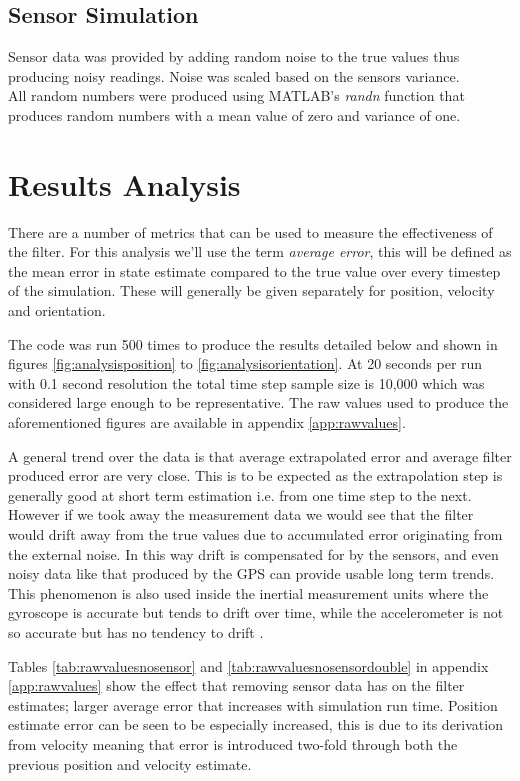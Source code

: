 \subsection{Sensor Simulation}
Sensor data was provided by adding random noise to the true values thus producing noisy readings. Noise was scaled based on the sensors variance.\\

\smallskip
\noindent All random numbers were produced using MATLAB's \textit{randn} function that produces random numbers with a mean value of zero and variance of one.


\section{Results Analysis}
There are a number of metrics that can be used to measure the effectiveness of the filter. For this analysis we'll use the term \textit{average error}, this will be defined as the mean error in state estimate compared to the true value over every timestep of the simulation. These will generally be given separately for position, velocity and orientation. \par
	The code was run 500 times to produce the results detailed below and shown in figures \ref{fig:analysisposition} to \ref{fig:analysisorientation}. At 20 seconds per run with 0.1 second resolution the total time step sample size is 10,000 which was considered large enough to be representative. The raw values used to produce the aforementioned figures are available in appendix \ref{app:rawvalues}.\par
    A general trend over the data is that average extrapolated error and average filter produced error are very close. This is to be expected as the extrapolation step is generally good at short term estimation i.e. from one time step to the next. However if we took away the measurement data we would see that the filter would drift away from the true values due to accumulated error originating from the external noise. In this way drift is compensated for by the sensors, and even noisy data like that produced by the GPS can provide usable long term trends. This phenomenon is also used inside the inertial measurement units where the gyroscope is accurate but tends to drift over time, while the accelerometer is not so accurate but has no tendency to drift \cite{gade2009introduction}. \par
    Tables \ref{tab:rawvaluesnosensor} and \ref{tab:rawvaluesnosensordouble} in appendix \ref{app:rawvalues} show the effect that removing sensor data has on the filter estimates; larger average error that increases with simulation run time. Position estimate error can be seen to be especially increased, this is due to its derivation from velocity meaning that error is introduced two-fold through both the previous position and velocity estimate. 

